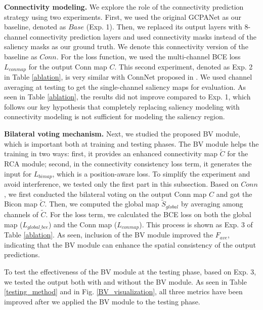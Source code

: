 \documentclass[final]{cvpr}
\begin{document}
\textbf{Connectivity modeling.} We explore the role of the connectivity prediction strategy using two experiments. First, we used the original GCPANet as our baseline, denoted as $Base$ (Exp. 1). Then, we replaced its output layers with 8-channel connectivity prediction layers and used connectivity masks instead of the saliency masks as our ground truth. We denote this connectivity version of the baseline as $Conn$. For the loss function, we used the multi-channel BCE loss $L_{conmap}$ for the output Conn map $C$. This second experiment, denoted as Exp. 2 in Table \ref{ablation}, is very similar with ConnNet proposed in \cite{ConnNet}. We used channel averaging at testing to get the single-channel saliency maps for evaluation. As seen in Table \ref{ablation}, the results did not improve compared to Exp. 1, which follows our key hypothesis that completely replacing saliency modeling with connectivity modeling is not sufficient for modeling the saliency region.


\textbf{Bilateral voting mechanism.} Next, we studied the proposed BV module, which is important both at training and testing phases. The BV module helps the training in two ways: first, it provides an enhanced connectivity map $\widetilde{C}$ for the RCA module; second, in the connectivity consistency loss term, it generates the input for $L_{bimap}$, which is a position-aware loss. To simplify the experiment and avoid interference, we tested only the first part in this subsection. Based on $Conn$, we first conducted the bilateral voting on the output Conn map $C$ and got the Bicon map $\widetilde{C}$. Then, we computed the global map $\widetilde{S}_{global}$ by averaging among channels of $\widetilde{C}$. For the loss term, we calculated the BCE loss on both the global map ($L_{global\_bce}$) and the Conn map ($L_{conmap}$). This process is shown as Exp. 3 of Table \ref{ablation}. As seen, inclusion of the BV module improved the  $F_{ave}$, indicating that the BV module can enhance the spatial consistency of the output predictions.

To test the effectiveness of the BV module at the testing phase, based on Exp. 3, we tested the output both with and without the BV module. As seen in Table \ref{testing_method} and in Fig. \ref{BV_visualization}, all three metrics have been improved after we applied the BV module to the testing phase.
\end{document}
